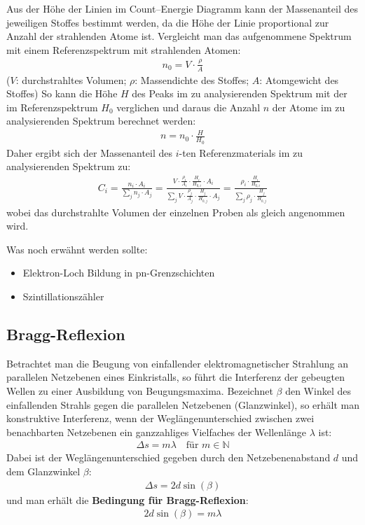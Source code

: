 \documentclass[10pt, a4paper]{article}
\begin{document}
Aus der Höhe der Linien im Count--Energie Diagramm kann der Massenanteil des jeweiligen Stoffes bestimmt werden, da die Höhe der Linie proportional zur Anzahl der strahlenden Atome ist.
Vergleicht man das aufgenommene Spektrum mit einem Referenzspektrum mit strahlenden Atomen:
\begin{align}
  n_0 = V \cdot \frac{\rho}{A}
\end{align}
($V$: durchstrahltes Volumen; $\rho$: Massendichte des Stoffes; $A$: Atomgewicht des Stoffes)
So kann die Höhe $H$ des Peaks im zu analysierenden Spektrum mit der im Referenzspektrum $H_0$ verglichen und daraus die Anzahl $n$ der Atome im zu analysierenden Spektrum berechnet werden:
\begin{align}
  n = n_0 \cdot \frac{H}{H_0}
\end{align}
Daher ergibt sich der Massenanteil des $i$-ten Referenzmaterials im zu analysierenden Spektrum zu:
\begin{align}
  C_i = \frac{n_i \cdot A_i}{\sum_j n_j \cdot A_j} = \frac{V \cdot \frac{\rho_i}{A_i} \cdot \frac{H_i}{H_{0,i}} \cdot A_i}{\sum_j V \cdot \frac{\rho_j}{A_j} \cdot \frac{H_j}{H_{0,j}}\cdot A_j} = \frac{\rho_i \cdot \frac{H_i}{H_{0,i}}}{\sum_j \rho_j \cdot \frac{H_j}{H_{0,j}}}
\end{align}
wobei das durchstrahlte Volumen der einzelnen Proben als gleich angenommen wird.

Was noch erwähnt werden sollte:
\begin{itemize}
  \item Elektron-Loch Bildung in pn-Grenzschichten
  \item Szintillationszähler
\end{itemize}

\subsection{Bragg-Reflexion}
Betrachtet man die Beugung von einfallender elektromagnetischer Strahlung an parallelen Netzebenen eines Einkristalls, so führt die Interferenz der gebeugten Wellen zu einer Ausbildung von Beugungsmaxima.
Bezeichnet $\beta$ den Winkel des einfallenden Strahls gegen die parallelen Netzebenen (Glanzwinkel), so erhält man konstruktive Interferenz, wenn der Weglängenunterschied zwischen zwei benachbarten Netzebenen ein ganzzahliges Vielfaches der Wellenlänge $\lambda$ ist:
\begin{align}
  \Delta s = m \lambda \quad \text{für } m \in \mathbb{N}
\end{align}
Dabei ist der Weglängenunterschied gegeben durch den Netzebenenabstand $d$ und dem Glanzwinkel $\beta$:
\begin{align}
  \Delta s = 2 d \sin(\beta)
\end{align}
und man erhält die \textbf{Bedingung für Bragg-Reflexion}:
\begin{align}
  2 d \sin(\beta) = m \lambda
  \label{eq:bragg}
\end{align}
\end{document}
